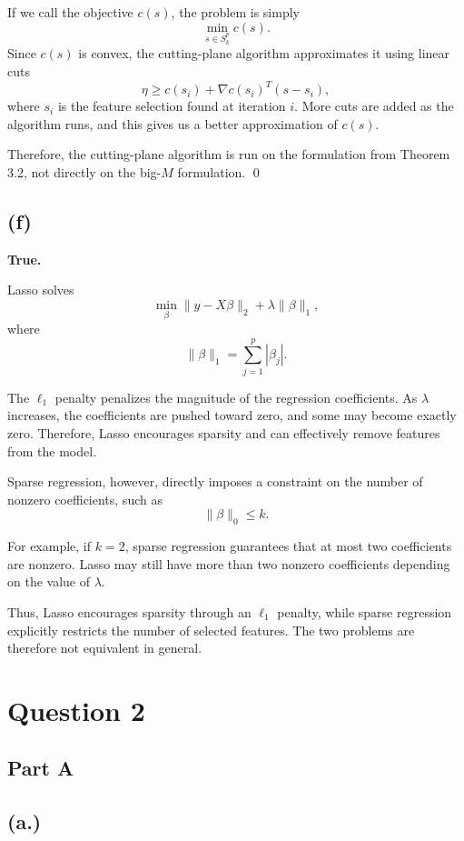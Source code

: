 \documentclass{article}
\begin{document}
If we call the objective $c(s)$, the problem is simply
\[
\min_{s\in S_k^p} c(s).
\]
Since $c(s)$ is convex, the cutting-plane algorithm approximates it using
linear cuts
\[
\eta \geq c(s_i)+\nabla c(s_i)^T(s-s_i),
\]
where $s_i$ is the feature selection found at iteration $i$. More cuts
are added as the algorithm runs, and this gives us a better approximation of
$c(s)$.

Therefore, the cutting-plane algorithm is run on the formulation from
Theorem 3.2, not directly on the big-$M$ formulation. \qed 

\subsection*{(f)}

\textbf{True.}

Lasso solves
\[
\min_\beta \|y-X\beta\|_2+\lambda\|\beta\|_1,
\]
where
\[
\|\beta\|_1=\sum_{j=1}^p |\beta_j|.
\]

The $\ell_1$ penalty penalizes the magnitude of the regression
coefficients. As $\lambda$ increases, the coefficients are pushed toward
zero, and some may become exactly zero. Therefore, Lasso encourages
sparsity and can effectively remove features from the model.

Sparse regression, however, directly imposes a constraint on the number
of nonzero coefficients, such as
\[
\|\beta\|_0 \leq k.
\]

For example, if $k=2$, sparse regression guarantees that at most two
coefficients are nonzero. Lasso may still have more than two nonzero
coefficients depending on the value of $\lambda$.

Thus, Lasso encourages sparsity through an $\ell_1$ penalty, while sparse
regression explicitly restricts the number of selected features. The two
problems are therefore not equivalent in general.


\newpage

\section*{Question 2}
\subsection*{Part A}

\subsection*{(a.)}
\end{document}
